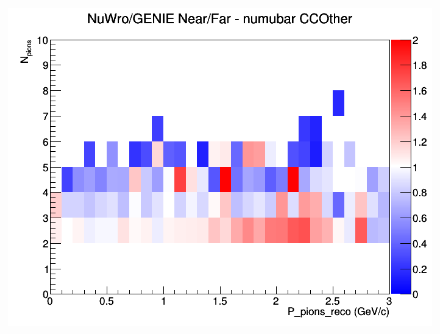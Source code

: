 \documentclass[12pt]{article}
\begin{document}
\begin{figure}[h]
\endminipage
{}
\includegraphics[width=\linewidth]{eff_N_P/LAr/pions/ratios/CCOther_NuWro_GENIE_numubar_NF_N_P.png}
\endminipage
\newline
\end{figure}
\clearpage
\end{document}
